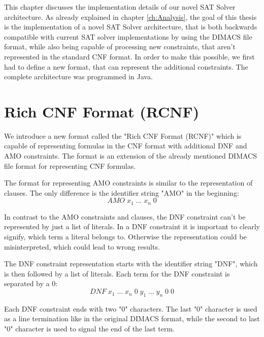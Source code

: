 This chapter discusses the implementation details of our novel SAT Solver architecture. As already explained in chapter \ref{ch:Analysis}, the goal of this thesis is the implementation of a novel SAT Solver architecture, that is both backwards compatible with current SAT solver implementations by using the DIMACS file format, while also being capable of processing new constraints, that aren't represented in the standard CNF format. In order to make this possible, we first had to define a new format, that can represent the additional constraints. The complete architecture was programmed in Java.

\section{Rich CNF Format (RCNF)}

We introduce a new format called the "Rich CNF Format (RCNF)" which is capable of representing formulas in the CNF format with additional DNF and AMO constraints. The format is an extension of the already mentioned DIMACS file format for representing CNF formulas.

\begin{leftbar}
The format for representing AMO constraints is similar to the representation of clauses. The only difference is the identifier string "AMO" in the beginning:
\begin{displaymath}
AMO \; x_1 \; ... \; x_n \; 0
\end{displaymath}
\end{leftbar}

In contrast to the AMO constraints and clauses, the DNF constraint can't be represented by just a list of literals. In a DNF constraint it is important to clearly signify, which term a literal belongs to. Otherwise the representation could be misinterpreted, which could lead to wrong results.

\begin{leftbar}
The DNF constraint representation starts with the identifier string "DNF", which is then followed by a list of literals. Each term for the DNF constraint is separated by a 0:
\begin{displaymath}
DNF \; x_1 \; ... \; x_n \; 0 \; y_1 \; ... \; y_n \; 0 \; 0
\end{displaymath}
\end{leftbar}

Each DNF constraint ends with two "0" characters. The last "0" character is used as a line termination like in the original DIMACS format, while the second to last "0" character is used to signal the end of the last term.

